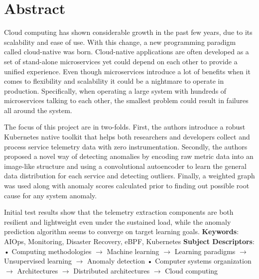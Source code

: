 \chapter*{Abstract}

Cloud computing has shown considerable growth in the past few years, due to its scalability and ease of use. With this change, a new programming paradigm called cloud-native was born. Cloud-native applications are often developed as a set of stand-alone microservices yet could depend on each other to provide a unified experience. Even though microservices introduce a lot of benefits when it comes to flexibility and scalability it could be a nightmare to operate in production. Specifically, when operating a large system with hundreds of microservices talking to each other, the smallest problem could result in failures all around the system.



The focus of this project are in two-folds. First, the authors introduce a robust Kubernetes native toolkit that helps both researchers and developers collect and process service telemetry data with zero instrumentation. Secondly, the authors proposed a novel way of detecting anomalies by encoding raw metric data into an image-like structure and using a convolutional autoencoder to learn the general data distribution for each service and detecting outliers. Finally, a weighted graph was used along with anomaly scores calculated prior to finding out possible root cause for any system anomaly.

Initial test results show that the telemetry extraction components are both resilient and lightweight even under the sustained load, while the anomaly prediction algorithm seems to converge on target learning goals.
\newline
\newline
\textbf{Keywords}:
AIOps, Monitoring, Disaster Recovery, eBPF, Kubernetes
\newline
\textbf{Subject Descriptors}:
• Computing methodologies $\rightarrow$ Machine learning $\rightarrow$ Learning paradigms $\rightarrow$ Unsupervised learning $\rightarrow$ Anomaly detection • Computer systems organization $\rightarrow$ Architectures $\rightarrow$ Distributed architectures $\rightarrow$ Cloud computing